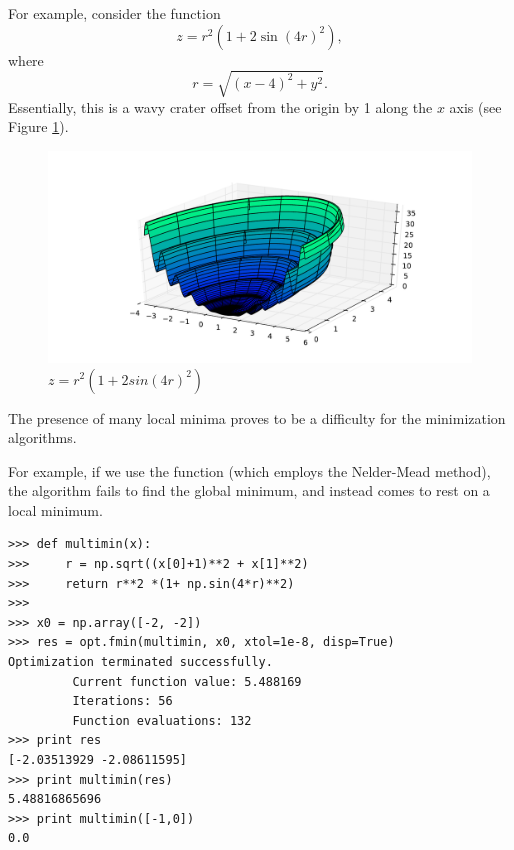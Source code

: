 For example, consider the function
\[
z = r^2 (1+ 2\sin(4r)^2),
\]
where
\[
r = \sqrt{(x-4)^2 + y^2}.
\]
Essentially, this is a wavy crater offset from the origin by 1 along the $x$ axis (see Figure \ref{opt:muiltmin}).
\begin{figure}
\includegraphics[width=\textwidth]{ManyMinima.pdf}
\caption{$z = r^2 (1+ 2sin(4r)^2)$}
\label{opt:muiltmin}
\end{figure}
The presence of many local minima proves to be a difficulty for the minimization algorithms.

For example, if we use the  function (which employs the Nelder-Mead method), the algorithm fails to find the global minimum, and instead comes to rest on a local minimum.
\begin{lstlisting}
>>> def multimin(x):
>>>     r = np.sqrt((x[0]+1)**2 + x[1]**2)
>>>     return r**2 *(1+ np.sin(4*r)**2)
>>>
>>> x0 = np.array([-2, -2])
>>> res = opt.fmin(multimin, x0, xtol=1e-8, disp=True)
Optimization terminated successfully.
         Current function value: 5.488169
         Iterations: 56
         Function evaluations: 132
>>> print res
[-2.03513929 -2.08611595]
>>> print multimin(res)
5.48816865696
>>> print multimin([-1,0])
0.0
\end{lstlisting}

